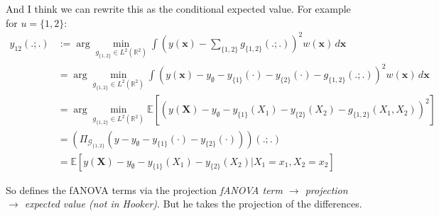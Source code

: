 And I think we can rewrite this as the conditional expected value. For example for $u = \{1,2\}$:
\begin{align*}
    y_{12}(.;.) &:= \arg \min_{g_{\{1,2\}} \in L^2(\mathbb{R}^2)} \int \left( y(\boldsymbol{x}) - \sum_{\{1,2\}} g_{\{1,2\}}(.;.) \right)^2 w(\boldsymbol{x}) \, d\boldsymbol{x} \\
    &= \arg \min_{g_{\{1,2\}} \in L^2(\mathbb{R}^2)} \int \left( y(\boldsymbol{x}) - y_\emptyset - y_{\{1\}}(\cdot) - y_{\{2\}}(\cdot) - g_{\{1,2\}}(.;.) \right)^2 w(\boldsymbol{x}) \, d\boldsymbol{x} \\
    &= \arg \min_{g_{\{1,2\}} \in L^2(\mathbb{R}^2)} \mathbb{E}[(y(\boldsymbol{X}) - y_\emptyset - y_{\{1\}}(X_1) - y_{\{2\}}(X_2) - g_{\{1,2\}}(X_1, X_2))^2] \\
    &= (\Pi_{\mathcal{G}_{\{1,2\}}}(y - y_\emptyset - y_{\{1\}}(\cdot) - y_{\{2\}}(\cdot)))(.;.) \\
    &= \mathbb{E}[y(\boldsymbol{X}) - y_{\emptyset} - y_{\{1\}}(X_1) - y_{\{2\}}(X_2) | X_1 = x_1, X_2 = x_2]
\end{align*}

So \cite{hooker2007} defines the fANOVA terms via the projection \textit{fANOVA term $\rightarrow$ projection $\rightarrow$ expected value (not in Hooker)}. But he takes the projection of the differences. 

